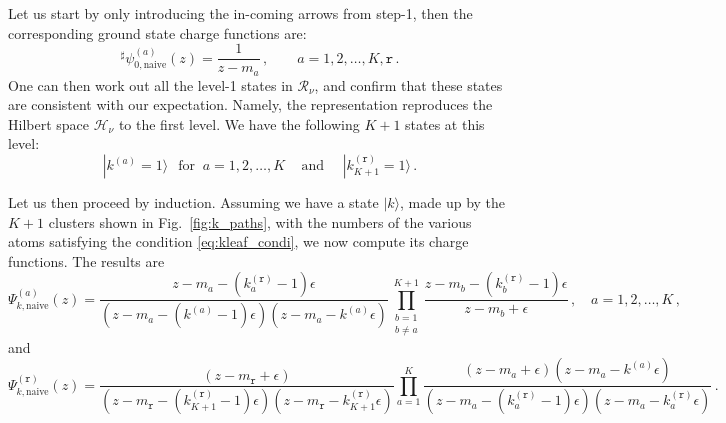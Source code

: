 \documentclass[12pt,a4paper]{article}
\renewcommand{\(}{\left(}
\renewcommand{\)}{\right)}
\renewcommand{\(}{\left(}
\renewcommand{\)}{\right)}
\begin{document}
Let us start by only introducing the in-coming arrows from step-1, then the corresponding ground state charge functions are:
\begin{equation}
{^\sharp}\psi^{(a)}_{0,\text{naive}}(z)=\frac{1}{z-m_a}\,,\qquad a=1,2,\dots,K,\mathtt{r}\,.
\end{equation}
One can then work out all the level-1 states in $\mathcal{R}_\nu$, and confirm that these states are consistent with our expectation. 
Namely, the representation reproduces the Hilbert space $\mathcal{H}_\nu$ to the first level. 
We have the following $K+1$ states at this level:
\begin{equation}
|k^{(a)}=1\rangle\,\ \text{ for }\  a=1,2,\dots,K\,\quad\text{and }\quad 
|k^{(\mathtt{r})}_{K+1}=1\rangle\,.
\end{equation}

\medskip

Let us then proceed by induction. 
Assuming we have a state $|k\rangle$, made up by the $K+1$ clusters shown in Fig.~\ref{fig:k_paths}, with the numbers of the various atoms satisfying the condition \eqref{eq:kleaf_condi},  
we now compute its charge functions. 
The results are
{\footnotesize
\begin{equation}
\Psi^{(a)}_{k,\text{naive}}(z)=\frac{z-m_a-(k^{(\mathtt{r})}_a-1)\epsilon}{(z-m_a-(k^{(a)}-1)\epsilon)(z-m_a-k^{(a)}\epsilon)}\prod_{\substack{b=1\\b\neq a}}^{K+1}\frac{z-m_b-(k^{(\mathtt{r})}_b-1)\epsilon}{z-m_b+\epsilon}\,,\quad a=1,2,\dots,K\,,
\end{equation}}
and
{\footnotesize
\begin{equation}
\Psi^{(\mathtt{r})}_{k,\text{naive}}(z)=\frac{(z-m_{\mathtt{r}}+\epsilon)}{(z-m_{\mathtt{r}}-(k^{(\mathtt{r})}_{K+1}-1)\epsilon)(z-m_{\mathtt{r}}-k^{(\mathtt{r})}_{K+1}\epsilon)}\prod_{a=1}^{K}\frac{(z-m_a+\epsilon)(z-m_a-k^{(a)}\epsilon)}{(z-m_a-(k^{(\mathtt{r})}_a-1)\epsilon)(z-m_a-k^{(\mathtt{r})}_a\epsilon)}\,.
\end{equation}}
\end{document}
